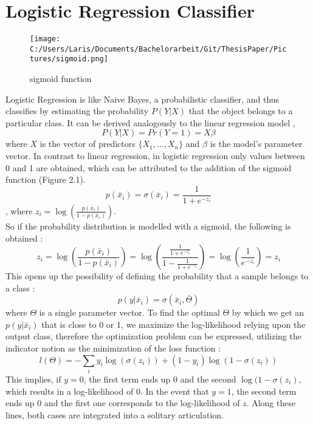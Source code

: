 \documentclass[a4paper, 11pt,titlepage,oneside,openany]{book}
\begin{document}
\section{Logistic Regression Classifier}
\begin{figure}[h]
	\centering
	\texttt{[image: C:/Users/Laris/Documents/Bachelorarbeit/Git/ThesisPaper/Pictures/sigmoid.png]}
	\caption{sigmoid function \cite{algorithms}}
\end{figure}
\noindent Logistic Regression is like Naive Bayes, a probabilistic classifier, and thus classifies by estimating the probability $P(Y|X)$ that the object belongs to a particular class.
It can be derived analogously to the linear regression model \cite{logisticregressionbook}, 
\[
P(Y|X)=Pr(Y=1)=X\beta
\]
where $X$ is the vector of predictors $\{X_1,...,X_n\}$ and $\beta$ is the model's parameter vector. In contrast to linear regression, in logistic regression only values between 0 and 1 are obtained, which can be attributed to the addition of the sigmoid function \cite{algorithms2} (Figure 2.1).
\[
p(\bar{x}_i)=\sigma(\bar{x}_i)=\frac{1}{1+e^{-z_i}}
\]
, where $z_i=\log(\frac{p(\bar{x}_i)}{1-p(\bar{x}_i)})$. \\
So if the probability distribution is modelled with a sigmoid, the following is obtained \cite{algorithms2}:
\[
z_i=\log(\frac{p(\bar{x}_i)}{1-p(\bar{x}_i)})=\log(\frac{\frac{1}{1+e^{-z_i}}}{1-\frac{1}{1+e^{-z_i}}})=\log(\frac{1}{e^{-z_i}})=z_i
\]
This opens up the possibility of defining the probability that a sample belongs to a class \cite{algorithms2}:
\[
p(y|\bar{x}_i)=\sigma(\bar{x}_i,\bar{\Theta})
\]
where $\Theta$ is a single parameter vector.
\noindent To find the optimal $\Theta$ by which we get an $p(y|\bar{x}_i)$ that is close to 0 or 1, we maximize the log-likelihood relying upon the output class, therefore the optimization problem can be expressed, utilizing the indicator notion as the minimization of the loss function \cite{algorithms}:
\[
l(\Theta)=-\sum_{i}y_i\log(\sigma(z_i))+(1-y_i)\log(1-\sigma(z_i))
\]
\noindent This implies, if $y=0$, the first term ends up $0$ and the second $\log(1-\sigma(z_i)$, which results in a log-likelihood of $0$. In the event that $y=1$, the second term ends up 0 and the first one corresponds to the log-likelihood of $z$. Along these lines, both cases are integrated into a solitary articulation. \\
\end{document}
